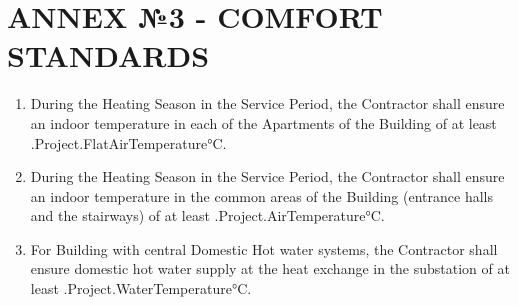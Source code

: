 \section{ANNEX №3 {-} COMFORT STANDARDS}

\begin{enumerate}[label=\arabic*.]
\item During the Heating Season in the Service Period, the Contractor shall ensure an indoor temperature in each of the Apartments of the Building of at least \iffalse input project.flat_airtemp value="{{.Project.FlatAirTemperature}}" \fi {{.Project.FlatAirTemperature}}°C.

	\item During the Heating Season in the Service Period, the Contractor shall ensure an indoor temperature in the common areas of the Building (entrance halls and the stairways) of at least \iffalse input project.airtemp value="{{.Project.AirTemperature}}" \fi {{.Project.AirTemperature}}°C.

  \item For Building with central Domestic Hot water systems, the Contractor shall ensure domestic hot water supply at the heat exchange in the substation of at least \iffalse input project.watertemp value="{{.Project.WaterTemperature}}" \fi {{.Project.WaterTemperature}}°C.
\end{enumerate}
